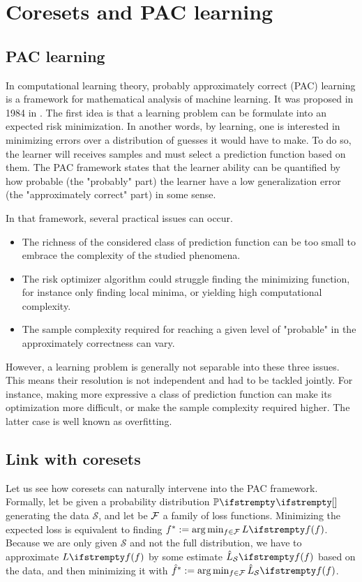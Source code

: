 \section{Coresets and PAC learning}
\subsection{PAC learning}In computational learning theory, probably approximately correct (PAC) learning is a framework for mathematical analysis of machine learning. It was proposed in 1984 in \cite{valiant1984learnable}. The first idea is that a learning problem can be formulate into an expected risk minimization. In another words, by learning, one is interested in minimizing errors over a distribution of guesses it would have to make. To do so, the learner will receives samples and must select a prediction function based on them. The PAC framework states that the learner ability can be quantified by how probable (the "probably" part) the learner have a low generalization error (the "approximately correct" part) in some sense.



In that framework, several practical issues can occur. 
\begin{itemize}
    \item The richness of the considered class of prediction function can be too small to embrace the complexity of the studied phenomena.
    \item The risk optimizer algorithm could struggle finding the minimizing function, for instance only finding local minima, or yielding high computational complexity.
    \item The sample complexity required for reaching a given level of "probable" in the approximately correctness can vary.
\end{itemize}

However, a learning problem is generally not separable into these three issues. This means their resolution is not independent and had to be tackled jointly. For instance, making more expressive a class of prediction function can make its optimization more difficult, or make the sample complexity required higher. The latter case is well known as overfitting.

\subsection{Link with coresets}

Let us see how coresets can naturally intervene into the PAC framework. Formally, let be given a probability distribution $\PP{}{}$ generating the data $\mathcal{S}$, and let be $\mathcal{F}$ a family of loss functions. Minimizing the expected loss is equivalent to finding $\query^*:= \arg \min_{\query \in \queryset} \loss{\query}$. Because we are only given $\mathcal{S}$ and not the full distribution, we have to approximate $\loss{\query}$ by some estimate $\estloss{\mathcal{S}}{\query}$ based on the data, and then minimizing it with $\hat{\query}^* := \arg \min_{\query\in \queryset} \estloss{\mathcal{S}}{\query}$. 


